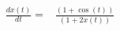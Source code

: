 \begin{align}
\frac{dx(t)}{dt} =& \frac{\left( 1 + \cos\left( t \right) \right)}{\left( 1 + 2 x\left( t \right) \right)}
\end{align}
